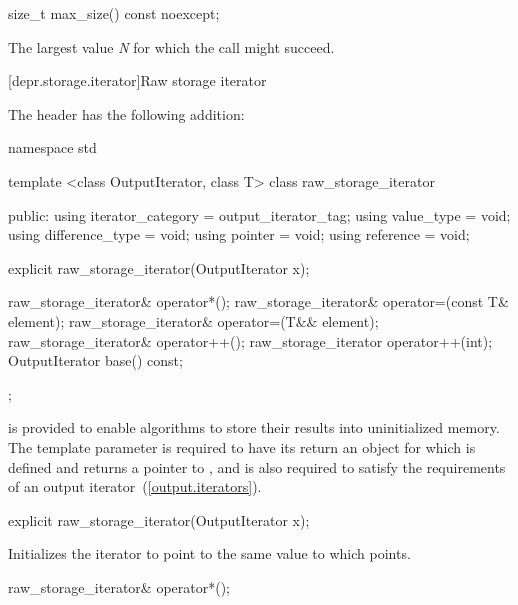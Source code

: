 \begin{itemdecl}
size_t max_size() const noexcept;
\end{itemdecl}

\begin{itemdescr}
\pnum
\returns
The largest value \textit{N} for which the call 
might succeed.
\end{itemdescr}

[depr.storage.iterator]{Raw storage iterator}

\pnum
The header  has the following addition:

%
\begin{codeblock}
namespace std {
  template <class OutputIterator, class T>
  class raw_storage_iterator {
  public:
    using iterator_category = output_iterator_tag;
    using value_type        = void;
    using difference_type   = void;
    using pointer           = void;
    using reference         = void;

    explicit raw_storage_iterator(OutputIterator x);

    raw_storage_iterator& operator*();
    raw_storage_iterator& operator=(const T& element);
    raw_storage_iterator& operator=(T&& element);
    raw_storage_iterator& operator++();
    raw_storage_iterator  operator++(int);
    OutputIterator base() const;
  };
}
\end{codeblock}

\pnum
{} is provided to enable algorithms to store their
results into uninitialized memory. The template parameter
 is required to have its  return an
object for which  is defined and returns a pointer to
, and is also required to satisfy the requirements of an output
iterator~(\ref{output.iterators}).

%
\begin{itemdecl}
explicit raw_storage_iterator(OutputIterator x);
\end{itemdecl}

\begin{itemdescr}
\pnum
\effects
Initializes the iterator to point to the same value to which  points.
\end{itemdescr}

\begin{itemdecl}
raw_storage_iterator& operator*();
\end{itemdecl}


